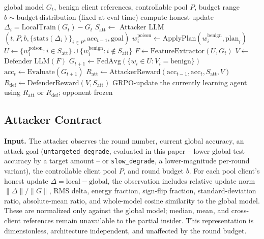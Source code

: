 \documentclass[conference]{IEEEtran}
\begin{document}
\begin{algorithm}[t]
\caption{Phase-2 Stackelberg Round}
\label{alg:round}
\begin{algorithmic}[1]
\Require global model $G_{t}$, benign client references, controllable pool $P$, budget range
\State $b \sim \mathrm{budget\ distribution}$ (fixed at eval time)
    \State compute honest update $\Delta_i = \mathrm{LocalTrain}(G_t) - G_t$
\EndFor
\State $S_{\text{att}} \gets$ Attacker LLM$(t, P, b, \{\mathrm{stats}(\Delta_i)\}_{i\in P}, \mathrm{acc}_{t-1}, \mathrm{goal})$
    \State $w_i^{\text{poison}} \gets \mathrm{ApplyPlan}(w_i^{\text{benign}}, \mathrm{plan}_i)$
\EndFor
\State $U \gets \{w_i^{\text{poison}} : i \in S_{\text{att}}\} \cup \{w_i^{\text{benign}} : i \notin S_{\text{att}}\}$
\State $F \gets \mathrm{FeatureExtractor}(U, G_t)$
\State $V \gets$ Defender LLM$(F)$
\State $G_{t+1} \gets \mathrm{FedAvg}(\{w_i \in U : V_i = \mathrm{benign}\})$
\State $\mathrm{acc}_t \gets \mathrm{Evaluate}(G_{t+1})$
\State $R_{\text{att}} \gets \mathrm{AttackerReward}(\mathrm{acc}_{t-1}, \mathrm{acc}_t, S_{\text{att}}, V)$
\State $R_{\text{def}} \gets \mathrm{DefenderReward}(V, S_{\text{att}})$
\State GRPO-update the currently learning agent using $R_{\text{att}}$ or $R_{\text{def}}$; opponent frozen
\end{algorithmic}
\end{algorithm}

\subsection{Attacker Contract}
\label{sec:attacker-contract}
\textbf{Input.} The attacker observes the round number, current global accuracy, an attack goal (\texttt{untargeted\_degrade}, evaluated in this paper -- lower global test accuracy by a target amount -- or \texttt{slow\_degrade}, a lower-magnitude per-round variant), the controllable client pool $P$, and round budget $b$. For each pool client's honest update $\Delta = \mathrm{local} - \mathrm{global}$, the observation includes relative update norm $\|\Delta\|/\|G\|$, RMS delta, energy fraction, sign-flip fraction, standard-deviation ratio, absolute-mean ratio, and whole-model cosine similarity to the global model. These are normalized only against the global model; median, mean, and cross-client references remain unavailable to the partial insider. This representation is dimensionless, architecture independent, and unaffected by the round budget.
\end{document}
